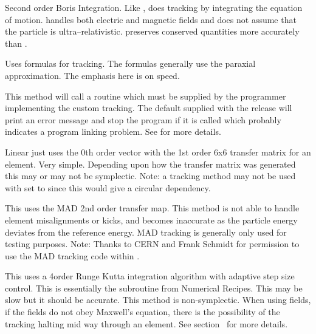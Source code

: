 \begin{description}

\item[\vn{Boris}]
Second order Boris Integration\cite{b:boris}. Like ,
 does tracking by integrating the equation of
motion.  handles both electric and magnetic fields and does
not assume that the particle is ultra--relativistic.  preserves
conserved quantities more accurately than .

\item[\vn{Bmad_Standard}]
Uses formulas for tracking. The formulas generally use the paraxial
approximation.  The emphasis here is on speed.

\item[\vn{Custom}]
This method will call a routine  which must be
supplied by the programmer implementing the custom tracking. The
default  supplied with the \bmad release will print
an error message and stop the program if it is called which probably
indicates a program linking problem. See  for more details.

\item[\vn{Linear}]
Linear just uses the 0th order vector with the 1st order 6x6 transfer matrix for an element. Very
simple. Depending upon how the transfer matrix was generated this may or may not be
symplectic. Note: a  tracking method may not be used with  set to
 since this would give a circular dependency.

\item[\vn{MAD}]
This uses the MAD 2nd order transfer map. This method is not able to
handle element misalignments or kicks, and becomes inaccurate as the
particle energy deviates from the reference energy. MAD tracking is
generally only used for testing purposes. Note: Thanks to CERN and
Frank Schmidt for permission to use the MAD tracking code within
\bmad.

\item[\vn{runge_kutta}]
This uses a 4\Th order Runge Kutta integration algorithm with adaptive
step size control.  This is essentially the  subroutine
from Numerical Recipes\cite{b:nr}. This may be slow but it should be
accurate. This method is non-symplectic.  When using
 fields, if the fields do not obey Maxwell's equation,
there is the possibility of the  tracking halting mid
way through an element. See section~ for more details.


\end{description}
